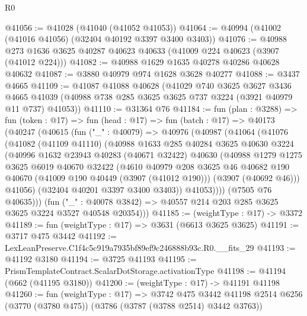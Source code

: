 \begin{lexlean}{R0}
\begin{coremodule}
@41056 := @41028 (@41040 (@41052 @41053))
@41064 := @40994 (@41002 (@41016 @41056) (@32404 @40192 @3397 @3400 @3403))
@41076 := @40988 @273 @1636 @3625 @40287 @40623 @40633 (@41009 @224 @40623 (@3907 (@41012 @224)))
@41082 := @40988 @1629 @1635 @40278 @40286 @40628 @40632
@41087 := @3880 @40979 @974 @1628 @3628 @40277
@41088 := @3437 @4665
@41109 := @41087
    @41088
    @40628
    (@41029
      @740
      @3625
      @3627
      @3436
      @4665
      @41039
      (@40988 @738 @285 @3625 @3625 @737 @3224 (@3921 @40979 @11 @737) @41053))
@41110 := @31364 @76
@41184 := fun (plan : @3288) =>
  fun (token : @17) =>
  fun (head : @17) =>
  fun (batch : @17) =>
  @40173
    (@40247
      (@40615
        (fun ("_" : @40079) =>
        @40976
          (@40987
            (@41064
              (@41076
                (@41082
                  (@41109 @41110)
                  (@40988
                    @1633
                    @285
                    @40284
                    @3625
                    @40630
                    @3224
                    (@40996
                      @1632
                      @23943
                      @40283
                      (@40671 @32422)
                      @40630
                      (@40988
                        @1279
                        @1275
                        @3625
                        @6019
                        @40670
                        @32422
                        (@4610
                          @40979
                          @208
                          @3625
                          @46
                          @40682
                          @190
                          @40670
                          (@41009 @190 @40449 (@3907 (@41012 @190)))
                          (@3907 (@40692 @46)))
                        @41056)
                      (@32404 @40201 @3397 @3400 @3403))
                    @41053))))
            (@7505 @76 @40635)))
        (fun ("_" : @40078 @3842) => @40557 @214 @203 @285 @3625 @3625 @3224 @3527 @40548 @20354)))
@41185 := (weightType : @17) -> @3372
@41189 := fun (weightType : @17) => @3631 (@6613 @3625 @3625)
@41191 := @3717 @475 @3442
@41192 := LexLeanPreserve.C1f4c5c919a7935bf89ef9c246888b93c.R0.__fits_29
@41193 := @41192 @3180
@41194 := @3725 @41193
@41195 := PrismTemplateContract.ScalarDotStorage.activationType
@41198 := @41194 (@662 (@41195 @3180))
@41200 := (weightType : @17) -> @41191 @41198
@41260 := fun (weightType : @17) =>
  @3742
    @475
    @3442
    @41198
    @2514
    @6256
    (@3770 (@3780 @475))
    (@3786 (@3787 (@3788 @2514) @3442 @3763))

\end{coremodule}
\end{lexlean}

